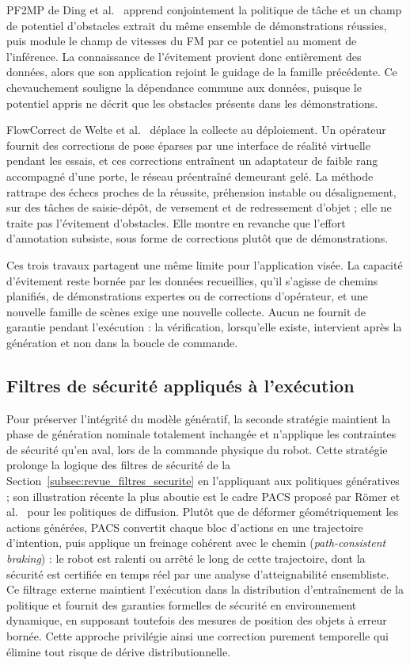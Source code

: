 PF2MP de Ding et al.~\cite{Ding2025Towards} apprend conjointement la politique de tâche et un champ de potentiel d'obstacles extrait du même ensemble de démonstrations réussies, puis module le champ de vitesses du \ac{FM} par ce potentiel au moment de l'inférence. La connaissance de l'évitement provient donc entièrement des données, alors que son application rejoint le guidage de la famille précédente. Ce chevauchement souligne la dépendance commune aux données, puisque le potentiel appris ne décrit que les obstacles présents dans les démonstrations.

FlowCorrect de Welte et al.~\cite{Welte2026Flowcorrect} déplace la collecte au déploiement. Un opérateur fournit des corrections de pose éparses par une interface de réalité virtuelle pendant les essais, et ces corrections entraînent un adaptateur de faible rang accompagné d'une porte, le réseau préentraîné demeurant gelé. La méthode rattrape des échecs proches de la réussite, préhension instable ou désalignement, sur des tâches de saisie-dépôt, de versement et de redressement d'objet ; elle ne traite pas l'évitement d'obstacles. Elle montre en revanche que l'effort d'annotation subsiste, sous forme de corrections plutôt que de démonstrations.

Ces trois travaux partagent une même limite pour l'application visée. La capacité d'évitement reste bornée par les données recueillies, qu'il s'agisse de chemins planifiés, de démonstrations expertes ou de corrections d'opérateur, et une nouvelle famille de scènes exige une nouvelle collecte. Aucun ne fournit de garantie pendant l'exécution : la vérification, lorsqu'elle existe, intervient après la génération et non dans la boucle de commande.

\subsection{Filtres de sécurité appliqués à l'exécution}
Pour préserver l'intégrité du modèle génératif, la seconde stratégie maintient la phase de génération nominale totalement inchangée et n'applique les contraintes de sécurité qu'en aval, lors de la commande physique du robot. Cette stratégie prolonge la logique des filtres de sécurité de la Section~\ref{subsec:revue_filtres_securite} en l'appliquant aux politiques génératives ; son illustration récente la plus aboutie est le cadre \ac{PACS} proposé par Römer et al.~\cite{Rmer2026From} pour les politiques de diffusion. Plutôt que de déformer géométriquement les actions générées, \ac{PACS} convertit chaque bloc d'actions en une trajectoire d'intention, puis applique un freinage cohérent avec le chemin (\textit{path-consistent braking}) : le robot est ralenti ou arrêté le long de cette trajectoire, dont la sécurité est certifiée en temps réel par une analyse d'atteignabilité ensembliste. Ce filtrage externe maintient l'exécution dans la distribution d'entraînement de la politique et fournit des garanties formelles de sécurité en environnement dynamique, en supposant toutefois des mesures de position des objets à erreur bornée. Cette approche privilégie ainsi une correction purement temporelle qui élimine tout risque de dérive distributionnelle.

